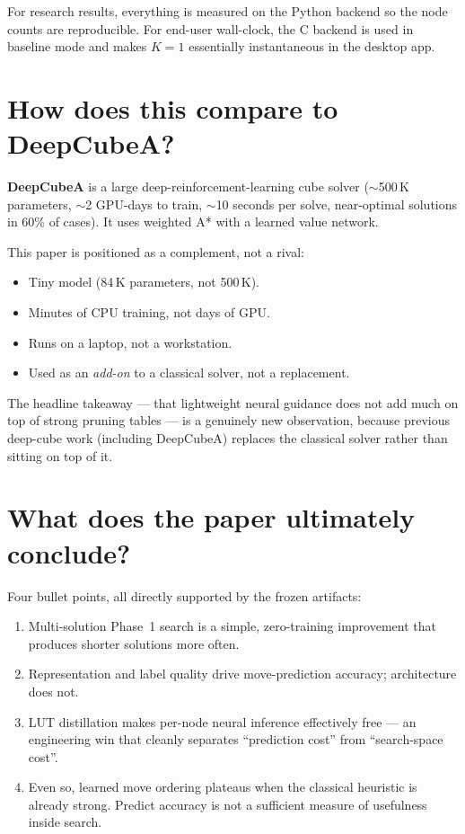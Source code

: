 \documentclass[11pt,a4paper]{article}
\newcommand{\defn}[1]{\textbf{#1}}
\begin{document}
For research results, everything is measured on the Python backend so
the node counts are reproducible. For end-user wall-clock, the C
backend is used in baseline mode and makes $K=1$ essentially
instantaneous in the desktop app.

\section{How does this compare to DeepCubeA?}

\defn{DeepCubeA} is a large deep-reinforcement-learning cube solver
($\sim$500\,K parameters, $\sim$2 GPU-days to train, $\sim$10 seconds per
solve, near-optimal solutions in 60\% of cases). It uses weighted A*
with a learned value network.

This paper is positioned as a complement, not a rival:

\begin{itemize}[leftmargin=2em]
  \item Tiny model (84\,K parameters, not 500\,K).
  \item Minutes of CPU training, not days of GPU.
  \item Runs on a laptop, not a workstation.
  \item Used as an \emph{add-on} to a classical solver, not a
        replacement.
\end{itemize}

The headline takeaway --- that lightweight neural guidance does not
add much on top of strong pruning tables --- is a genuinely new
observation, because previous deep-cube work (including DeepCubeA)
replaces the classical solver rather than sitting on top of it.

\section{What does the paper ultimately conclude?}

Four bullet points, all directly supported by the frozen artifacts:

\begin{enumerate}[leftmargin=2em]
  \item Multi-solution Phase~1 search is a simple, zero-training
        improvement that produces shorter solutions more often.
  \item Representation and label quality drive move-prediction
        accuracy; architecture does not.
  \item LUT distillation makes per-node neural inference effectively
        free --- an engineering win that cleanly separates ``prediction
        cost'' from ``search-space cost''.
  \item Even so, learned move ordering plateaus when the classical
        heuristic is already strong. Predict accuracy is not a
        sufficient measure of usefulness inside search.
\end{enumerate}
\end{document}
